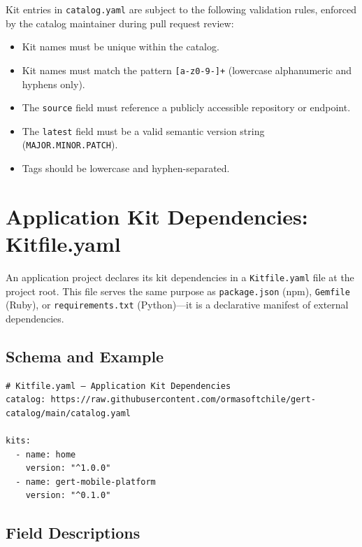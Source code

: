 Kit entries in \texttt{catalog.yaml} are subject to the following validation rules, enforced by the catalog maintainer during pull request review:

\begin{itemize}
  \item Kit names must be unique within the catalog.
  \item Kit names must match the pattern \texttt{[a-z0-9-]+} (lowercase alphanumeric and hyphens only).
  \item The \texttt{source} field must reference a publicly accessible repository or endpoint.
  \item The \texttt{latest} field must be a valid semantic version string (\texttt{MAJOR.MINOR.PATCH}).
  \item Tags should be lowercase and hyphen-separated.
\end{itemize}

\section{Application Kit Dependencies: Kitfile.yaml}
\label{sec:kitfile}

An application project declares its kit dependencies in a \texttt{Kitfile.yaml} file at the project root. This file serves the same purpose as \texttt{package.json} (npm), \texttt{Gemfile} (Ruby), or \texttt{requirements.txt} (Python)---it is a declarative manifest of external dependencies.

\subsection{Schema and Example}

\begin{verbatim}
# Kitfile.yaml — Application Kit Dependencies
catalog: https://raw.githubusercontent.com/ormasoftchile/gert-catalog/main/catalog.yaml

kits:
  - name: home
    version: "^1.0.0"
  - name: gert-mobile-platform
    version: "^0.1.0"
\end{verbatim}

\subsection{Field Descriptions}

